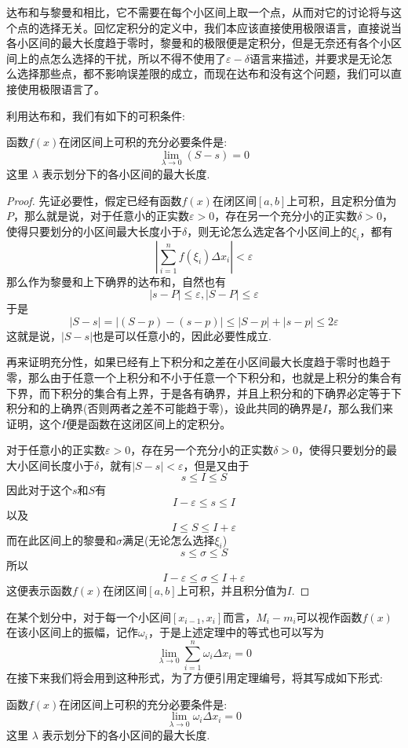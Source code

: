 达布和与黎曼和相比，它不需要在每个小区间上取一个点，从而对它的讨论将与这个点的选择无关。回忆定积分的定义中，我们本应该直接使用极限语言，直接说当各小区间的最大长度趋于零时，黎曼和的极限便是定积分，但是无奈还有各个小区间上的点怎么选择的干扰，所以不得不使用了$\varepsilon-\delta$语言来描述，并要求是无论怎么选择那些点，都不影响误差限的成立，而现在达布和没有这个问题，我们可以直接使用极限语言了。

利用达布和，我们有如下的可积条件:
\begin{theorem}
  \label{integrable-predication-theorem-1}
  函数$f(x)$在闭区间上可积的充分必要条件是:
  \[ \lim_{\lambda \to 0} (S - s) = 0 \]
  这里 $\lambda$ 表示划分下的各小区间的最大长度.
\end{theorem}

\begin{proof}
  先证必要性，假定已经有函数$f(x)$在闭区间$[a,b]$上可积，且定积分值为$P$，那么就是说，对于任意小的正实数$\varepsilon > 0$，存在另一个充分小的正实数$\delta > 0$，使得只要划分的小区间最大长度小于$\delta$，则无论怎么选定各个小区间上的$\xi_i$，都有
  \[ \left| \sum_{i=1}^n f(\xi_i) \Delta x_i \right| < \varepsilon \]
  那么作为黎曼和上下确界的达布和，自然也有
  \[ |s-P| \leqslant \varepsilon, |S-P| \leqslant \varepsilon \]
  于是
  \[ |S-s| = |(S-p) - (s-p)| \leqslant |S-p| + |s-p| \leqslant 2\varepsilon \]
  这就是说，$|S-s|$也是可以任意小的，因此必要性成立.

  再来证明充分性，如果已经有上下积分和之差在小区间最大长度趋于零时也趋于零，那么由于任意一个上积分和不小于任意一个下积分和，也就是上积分的集合有下界，而下积分的集合有上界，于是各有确界，并且上积分和的下确界必定等于下积分和的上确界(否则两者之差不可能趋于零)，设此共同的确界是$I$，那么我们来证明，这个$I$便是函数在这闭区间上的定积分。

  对于任意小的正实数$\varepsilon > 0$，存在另一个充分小的正实数$\delta > 0$，使得只要划分的最大小区间长度小于$\delta$，就有$|S-s|<\varepsilon$，但是又由于
  \[ s \leqslant I \leqslant S \]
  因此对于这个$s$和$S$有
  \[ I - \varepsilon \leqslant s \leqslant I \]
  以及
  \[ I \leqslant  S \leqslant I+\varepsilon \]
  而在此区间上的黎曼和$\sigma$满足(无论怎么选择$\xi_i$)
  \[ s \leqslant \sigma \leqslant S \]
  所以
  \[ I - \varepsilon \leqslant \sigma \leqslant I+\varepsilon \]
  这便表示函数$f(x)$在闭区间$[a,b]$上可积，并且积分值为$I$.
\end{proof}

在某个划分中，对于每一个小区间$[x_{i-1},x_i]$而言，$M_i-m_i$可以视作函数$f(x)$在该小区间上的振幅，记作$\omega_i$，于是上述定理中的等式也可以写为
\[ \lim_{\lambda \to 0} \sum_{i=1}^n \omega_i \Delta x_i = 0 \]
在接下来我们将会用到这种形式，为了方便引用定理编号，将其写成如下形式:
\begin{theorem}
  \label{integrable-predication-theorem-2}
  函数$f(x)$在闭区间上可积的充分必要条件是:
  \[ \lim_{\lambda \to 0} \omega_i \Delta x_i = 0 \]
  这里 $\lambda$ 表示划分下的各小区间的最大长度.
\end{theorem}

